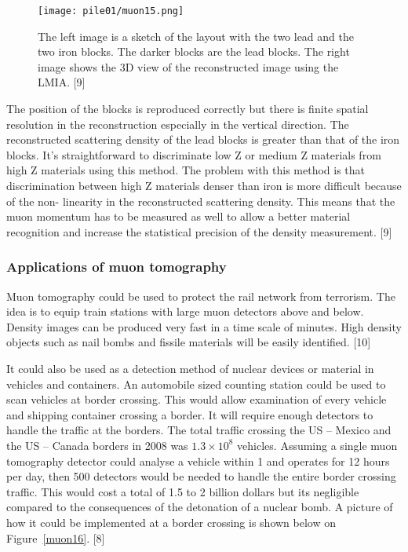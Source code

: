 \documentclass[twocolumn,a4paper]{article}
\begin{document}
\begin{figure}
  \texttt{[image: pile01/muon15.png]}
  \caption{The left image is a sketch of the layout with the two lead and the two iron blocks. The
darker blocks are the lead blocks. The right image shows the 3D view of the reconstructed image
using the LMIA. [9]}
  \label{muon15}
\end{figure}

The position of the blocks is reproduced correctly but there is finite spatial resolution in the
reconstruction especially in the vertical direction. The reconstructed scattering density of the lead
blocks is greater than that of the iron blocks. It’s straightforward to discriminate low Z or medium Z
materials from high Z materials using this method. The problem with this method is that
discrimination between high Z materials denser than iron is more difficult because of the non-
linearity in the reconstructed scattering density. This means that the muon momentum has to be
measured as well to allow a better material recognition and increase the statistical precision of the
density measurement. [9]

\subsubsection{Applications of muon tomography}
Muon tomography could be used to protect the rail network from terrorism. The idea is to equip
train stations with large muon detectors above and below. Density images can be produced very fast
in a time scale of minutes. High density objects such as nail bombs and fissile materials will be easily
identified. [10]

It could also be used as a detection method of nuclear devices or material in vehicles and containers.
An automobile sized counting station could be used to scan vehicles at border crossing. This would
allow examination of every vehicle and shipping container crossing a border. It will require enough
detectors to handle the traffic at the borders. The total traffic crossing the US -- Mexico and the US --
Canada borders in 2008 was \(1.3\times10^8\) vehicles. Assuming a single muon tomography detector could
analyse a vehicle within \unit{1}{\minute} and operates for 12 hours per day, then 500 detectors would be
needed to handle the entire border crossing traffic. This would cost a total of 1.5 to 2 billion dollars
but its negligible compared to the consequences of the detonation of a nuclear bomb. A picture of
how it could be implemented at a border crossing is shown below on Figure~\ref{muon16}. [8]
\end{document}
